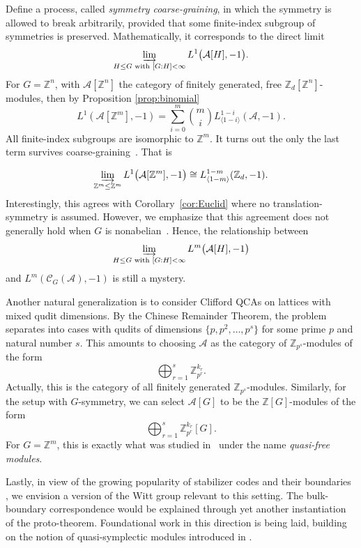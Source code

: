 \documentclass{article}
\theoremstyle{definition}
\newcommand{\CA}{{ \mathcal A}}
\newcommand{\ZZ}{{\mathbb Z}}
\begin{document}
Define a process, called \emph{symmetry coarse-graining}, in which the symmetry is allowed to break arbitrarily, provided that some finite-index subgroup of symmetries is preserved. Mathematically, it corresponds to the direct limit
\[
\varinjlim_{H \leq G \text{ with } [G : H] < \infty}  L^1\big(\mathcal{A}[H], -1\big).
\]
For \( G = \ZZ^n \), with \( \mathcal{A}[\ZZ^n] \) the category of finitely generated, free \( \ZZ_d[\ZZ^n] \)-modules, then by Proposition \ref{prop:binomial}
\[
L^1(\mathcal{A}[\mathbb{Z}^m], -1) = \sum_{i=0}^m \binom{m}{i} L^{1-i}_{\langle 1-i \rangle}(\mathcal{A},-1).
\]
All finite-index subgroups are isomorphic to $\ZZ^m$. It turns out the only the last term survives coarse-graining~\cite{haah2025topological}. That is

\[
\varinjlim_{\ZZ^m \leq \ZZ^m} L^1\big(\mathcal{A}[\ZZ^m], -1\big)\cong L^{1-m}_{\langle 1-m\rangle}(\ZZ_d,-1).
\] Interestingly, this agrees with Corollary~\ref{cor:Euclid} where no translation-symmetry is assumed. However, we emphasize that this agreement does not generally hold when \( G \) is nonabelian~\cite{weinberger-pc}. Hence, the relationship between $$
\varinjlim_{H \leq G \text{ with } [G : H] < \infty}  L^m\big(\mathcal{A}[H], -1\big)$$ and $L^m(\mathcal{C}_G(\CA), -1)$ is still a mystery. 

Another natural generalization is to consider Clifford QCAs on lattices with mixed qudit dimensions. By the Chinese Remainder Theorem, the problem separates into cases with qudits of dimensions \( \{p, p^2, \dots, p^s\} \) for some prime \( p \) and natural number \( s \). This amounts to choosing \( \mathcal{A} \) as the category of \( \ZZ_{p^s} \)-modules of the form
$$\bigoplus_{r=1}^s \ZZ_{p^r}^{k_r}.$$ Actually, this is the category of all finitely generated \( \ZZ_{p^s} \)-modules.
Similarly, for the setup with $G$-symmetry, we can select $\CA[G]$ to be the $\ZZ[G]$-modules of the form $$\bigoplus_{r=1}^s \ZZ_{p^r}^{k_r}[G].$$ For $G=\ZZ^m$, this is exactly what was studied in~\cite{ruba2024homological} under the name \emph{quasi-free modules}.

Lastly, in view of the growing popularity of stabilizer codes and their boundaries \cite{liang2024operator, liang2025generalized, liang2025planar, ruba2025witt}, we envision a version of the Witt group relevant to this setting. The bulk-boundary correspondence would be explained through yet another instantiation of the proto-theorem. Foundational work in this direction is being laid, building on the notion of quasi-symplectic modules introduced in \cite{ruba2024homological,ruba2025witt}.
\appendix
\end{document}
